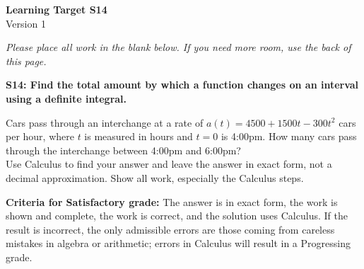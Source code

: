 \documentclass[10pt]{article}
\begin{document}
	\vspace*{0in}

		\begin{center}
			\textbf{Learning Target S14} \\
			{Version 1} \\
		\end{center}

\emph{Please place all work in the blank below. If you need more room, use the back of this page.}

\begin{framed}
	\textbf{S14: Find the total amount by which a function changes on an interval using a definite integral.}
\end{framed}

Cars pass through an interchange at a rate of $a(t) = 4500 + 1500t - 300t^2$ cars per hour, where $t$ is measured in hours and $t=0$ is 4:00pm. How many cars pass through the interchange between 4:00pm and 6:00pm? \\

Use Calculus to find your answer and leave the answer in exact form, not a decimal approximation. Show all work, especially the Calculus steps. 



\vfill


\begin{small}
    \begin{framed}
        	\textbf{Criteria for Satisfactory grade:} The answer is in exact form, the work is shown and complete, the work is correct, and the solution uses Calculus. If the result is incorrect, the only admissible errors are those coming from careless mistakes in algebra or arithmetic; errors in Calculus will result in a Progressing grade. 
    \end{framed}

\end{small}
\end{document}
